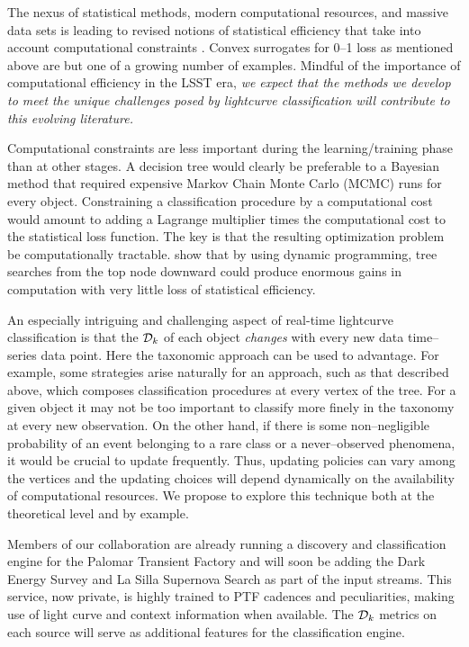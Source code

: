 The nexus of statistical methods, modern computational resources, and massive
data sets is leading to revised notions of statistical efficiency that take into
account computational constraints \citep{MeinBickRice2008}.  Convex surrogates
for 0--1 loss as mentioned above are but one of a growing number of examples.
Mindful of the importance of computational efficiency in the LSST era, {\it  we
expect that the methods we develop to meet the unique challenges posed by
lightcurve classification will contribute to this evolving literature.}

Computational constraints are less important during the learning/training phase
than at other stages.  A decision tree would clearly be preferable to a Bayesian
method that required expensive Markov Chain Monte Carlo (MCMC) runs for every
object. Constraining a classification procedure by a computational cost would
amount to adding a Lagrange multiplier times the computational cost to the
statistical loss function.  The key is that the resulting optimization problem
be computationally tractable.   \citet{MeinBickRice2008} show that by using
dynamic programming,  tree searches from the top node downward  could produce
enormous gains in computation with very little loss of statistical efficiency.

An especially intriguing and challenging aspect of  real-time lightcurve
classification is that the ${\cal D}_k$ of each object \emph{changes} with every
new data time--series data point. Here the taxonomic approach can be used to
advantage. For example, some strategies arise naturally for an approach, such as
that described above, which composes classification procedures at every vertex
of the tree. For a given object it may not be too important to classify more
finely in the taxonomy at every new observation.  On the other hand, if there is
some non--negligible probability of an event belonging to a rare class or a
never--observed phenomena, it would be crucial to update frequently.  Thus,
updating policies can vary among the vertices and the updating choices will
depend dynamically on the availability of computational resources. We propose to
explore this technique both at the theoretical level and by example.

 \smallskip

Members of our collaboration are already running a discovery and classification
engine for the Palomar Transient Factory and will soon be adding the Dark Energy
Survey and La Silla Supernova Search as part of the input streams.  This
service, now private, is highly trained to PTF cadences and peculiarities,
making use of light curve and context information when available. The ${\cal
D}_k$ metrics on each source will serve as additional features for the
classification engine.

